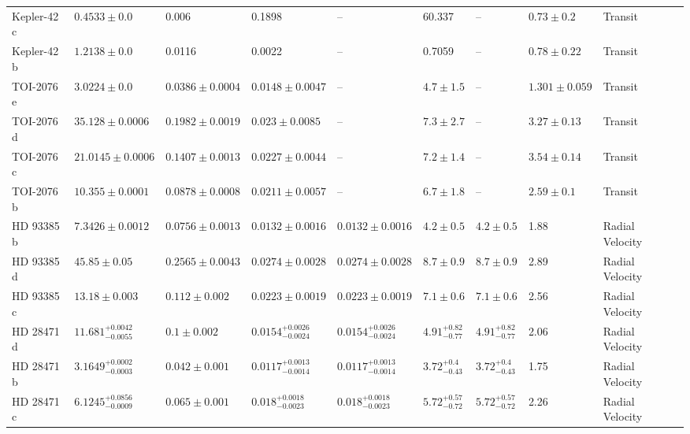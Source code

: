 \begin{tabular}{llllllllll}
Kepler-42 c & $0.4533 \pm 0.0$ & 0.006 & 0.1898 & -- & 60.337 & -- & $0.73 \pm 0.2$ & Transit & \cite{MUIRHEAD_ET_AL__2012} \\
Kepler-42 b & $1.2138 \pm 0.0$ & 0.0116 & 0.0022 & -- & 0.7059 & -- & $0.78 \pm 0.22$ & Transit & \cite{MUIRHEAD_ET_AL__2012} \\
TOI-2076 e & $3.0224 \pm 0.0$ & $0.0386 \pm 0.0004$ & $0.0148 \pm 0.0047$ & -- & $4.7 \pm 1.5$ & -- & $1.301 \pm 0.059$ & Transit & \cite{WANG_ET_AL_2026} \\
TOI-2076 d & $35.128 \pm 0.0006$ & $0.1982 \pm 0.0019$ & $0.023 \pm 0.0085$ & -- & $7.3 \pm 2.7$ & -- & $3.27 \pm 0.13$ & Transit & \cite{WANG_ET_AL_2026} \\
TOI-2076 c & $21.0145 \pm 0.0006$ & $0.1407 \pm 0.0013$ & $0.0227 \pm 0.0044$ & -- & $7.2 \pm 1.4$ & -- & $3.54 \pm 0.14$ & Transit & \cite{WANG_ET_AL_2026} \\
TOI-2076 b & $10.355 \pm 0.0001$ & $0.0878 \pm 0.0008$ & $0.0211 \pm 0.0057$ & -- & $6.7 \pm 1.8$ & -- & $2.59 \pm 0.1$ & Transit & \cite{WANG_ET_AL_2026} \\
HD 93385 b & $7.3426 \pm 0.0012$ & $0.0756 \pm 0.0013$ & $0.0132 \pm 0.0016$ & $0.0132 \pm 0.0016$ & $4.2 \pm 0.5$ & $4.2 \pm 0.5$ & 1.88 & Radial Velocity & \cite{UNGER_ET_AL__2021} \\
HD 93385 d & $45.85 \pm 0.05$ & $0.2565 \pm 0.0043$ & $0.0274 \pm 0.0028$ & $0.0274 \pm 0.0028$ & $8.7 \pm 0.9$ & $8.7 \pm 0.9$ & 2.89 & Radial Velocity & \cite{UNGER_ET_AL__2021} \\
HD 93385 c & $13.18 \pm 0.003$ & $0.112 \pm 0.002$ & $0.0223 \pm 0.0019$ & $0.0223 \pm 0.0019$ & $7.1 \pm 0.6$ & $7.1 \pm 0.6$ & 2.56 & Radial Velocity & \cite{UNGER_ET_AL__2021} \\
HD 28471 d & $11.681^{+0.0042}_{-0.0055}$ & $0.1 \pm 0.002$ & $0.0154^{+0.0026}_{-0.0024}$ & $0.0154^{+0.0026}_{-0.0024}$ & $4.91^{+0.82}_{-0.77}$ & $4.91^{+0.82}_{-0.77}$ & 2.06 & Radial Velocity & \cite{STEVENSON_ET_AL_2025} \\
HD 28471 b & $3.1649^{+0.0002}_{-0.0003}$ & $0.042 \pm 0.001$ & $0.0117^{+0.0013}_{-0.0014}$ & $0.0117^{+0.0013}_{-0.0014}$ & $3.72^{+0.4}_{-0.43}$ & $3.72^{+0.4}_{-0.43}$ & 1.75 & Radial Velocity & \cite{STEVENSON_ET_AL_2025} \\
HD 28471 c & $6.1245^{+0.0856}_{-0.0009}$ & $0.065 \pm 0.001$ & $0.018^{+0.0018}_{-0.0023}$ & $0.018^{+0.0018}_{-0.0023}$ & $5.72^{+0.57}_{-0.72}$ & $5.72^{+0.57}_{-0.72}$ & 2.26 & Radial Velocity & \cite{STEVENSON_ET_AL_2025} \\

\end{tabular}
